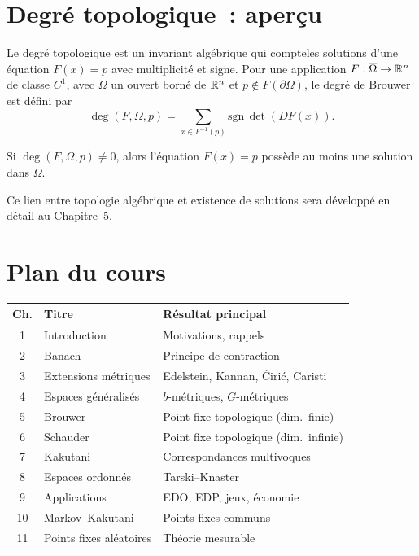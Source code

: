 \section{Degr\'e topologique~: aper\c{c}u}

Le degr\'e topologique est un invariant alg\'ebrique qui \og{}compte\fg les
solutions d'une \'equation $F(x) = p$ avec multiplicit\'e et signe. Pour une
application $F : \overline{\Omega} \to \mathbb{R}^n$ de classe $C^1$, avec $\Omega$ un
ouvert born\'e de $\mathbb{R}^n$ et $p \notin F(\partial\Omega)$, le degr\'e de Brouwer
est d\'efini par
\[
    \deg(F, \Omega, p) = \sum_{x \in F^{-1}(p)} \mathrm{sgn}\,\det(DF(x)).
\]

\begin{theoreme}
Si $\deg(F, \Omega, p) \neq 0$, alors l'\'equation $F(x) = p$ poss\`ede au moins
une solution dans $\Omega$.
\end{theoreme}

Ce lien entre topologie alg\'ebrique et existence de solutions sera d\'evelopp\'e
en d\'etail au Chapitre~5.

\section{Plan du cours}

\begin{formules}[title=\textbf{Architecture du cours}]
\begin{center}
\renewcommand{\arraystretch}{1.3}
\begin{tabular}{|c|l|l|}
\hline
\textbf{Ch.} & \textbf{Titre} & \textbf{R\'esultat principal} \\
\hline
1 & Introduction & Motivations, rappels \\
2 & Banach & Principe de contraction \\
3 & Extensions m\'etriques & Edelstein, Kannan, \'Ciri\'c, Caristi \\
4 & Espaces g\'en\'eralis\'es & $b$-m\'etriques, $G$-m\'etriques \\
5 & Brouwer & Point fixe topologique (dim.\ finie) \\
6 & Schauder & Point fixe topologique (dim.\ infinie) \\
7 & Kakutani & Correspondances multivoques \\
8 & Espaces ordonn\'es & Tarski--Knaster \\
9 & Applications & EDO, EDP, jeux, \'economie \\
10 & Markov--Kakutani & Points fixes communs \\
11 & Points fixes al\'eatoires & Th\'eorie mesurable \\
\hline
\end{tabular}
\end{center}
\end{formules}


